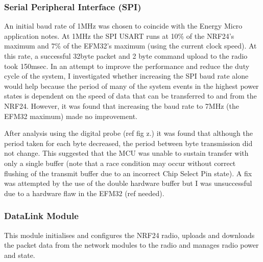 \subsubsection{Serial Peripheral Interface (SPI)}
An initial baud rate of 1MHz was chosen to coincide with the Energy Micro application notes. At
1MHz the \ac{SPI} \ac{USART} runs at 10\% of the NRF24's maximum and 7\% of the EFM32's maximum (using
the current clock speed). At this rate, a successful 32byte packet and 2 byte command upload to the
radio took 150msec. In an attempt to improve the performance and reduce the duty cycle of the
system, I investigated whether increasing the \ac{SPI} baud rate alone would help because the period of
many of the system events in the highest power states is dependent on the speed of data that can
be transferred to and from the \ac{NRF24}. However, it was found that increasing the baud rate to 7MHz
(the EFM32 maximum) made no improvement.

After analysis using the digital probe (ref fig z.) it was found that although the period taken for each
byte decreased, the period between byte transmission did not change. This suggested that the \ac{MCU}
was unable to sustain transfer with only a single buffer (note that a race condition may occur
without correct flushing of the transmit buffer due to an incorrect Chip Select Pin state). A fix was
attempted by the use of the double hardware buffer but I was unsuccessful due to a hardware flaw
in the EFM32 (ref needed).


\subsubsection{DataLink Module}
This module initialises and configures the \ac{NRF24} radio, uploads and downloads the packet data from
the network modules to the radio and manages radio power and state.

